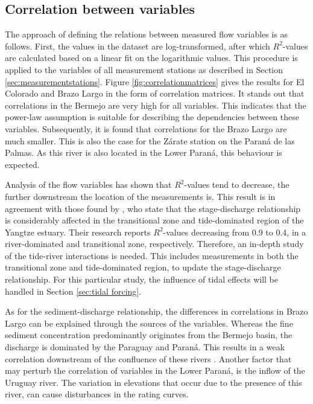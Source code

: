 \subsection{Correlation between variables}
\label{sec:correlation of variables}
The approach of defining the relations between measured flow variables is as follows. First, the values in the dataset are log-transformed, after which $R^2$-values are calculated based on a linear fit on the logarithmic values. This procedure is applied to the variables of all measurement stations as described in Section \ref{sec:measurementstations}. Figure \ref{fig:correlationmatrices} gives the results for El Colorado and Brazo Largo in the form of correlation matrices. It stands out that correlations in the Bermejo are very high for all variables. This indicates that the power-law assumption is suitable for describing the dependencies between these variables. Subsequently, it is found that correlations for the Brazo Largo are much smaller. This is also the case for the Zárate station on the Paraná de las Palmas. As this river is also located in the Lower Paraná, this behaviour is expected. 

Analysis of the flow variables has shown that $R^2$-values tend to decrease, the further downstream the location of the measurements is. This result is in agreement with those found by \citeauthor{songEvaluatingUnderstandingTideriver2024}, who state that the stage-discharge relationship is considerably affected in the transitional zone and tide-dominated region of the Yangtze estuary. Their research reports $R^2$-values decreasing from 0.9 to 0.4, in a river-dominated and transitional zone, respectively. Therefore, an in-depth study of the tide-river interactions is needed. This includes measurements in both the transitional zone and tide-dominated region, to update the stage-discharge relationship. For this particular study, the influence of tidal effects will be handled in Section \ref{sec:tidal forcing}.

As for the sediment-discharge relationship, the differences in correlations in Brazo Largo can be explained through the sources of the variables. Whereas the fine sediment concentration predominantly originates from the Bermejo basin, the discharge is dominated by the Paraguay and Paraná. This results in a weak correlation downstream of the confluence of these rivers \autocite{lopezweibelSourcesTemporalDynamics2022}. Another factor that may perturb the correlation of variables in the Lower Paraná, is the inflow of the Uruguay river. The variation in elevations that occur due to the presence of this river, can cause disturbances in the rating curves. 


